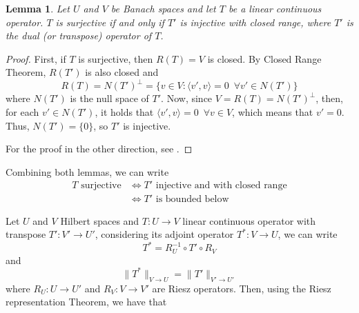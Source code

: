 \documentclass{article}
\newtheorem{lemma}{Lemma}
\begin{document}
\begin{lemma}
    Let \(U\) and \(V\) be Banach spaces and let \(T\) be a linear continuous 
    operator. \(T\) is surjective if and only if \(T'\) is injective with closed 
    range, where \(T'\) is the dual (or transpose) operator of \(T\).
\end{lemma}
\begin{proof}
    First, if \(T\) is surjective, then \(R(T) = V\) is closed. By Closed Range 
    Theorem, \(R(T')\) is also closed and 
    \begin{displaymath}
        R(T) = N(T')^\bot = 
        \{v\in V: \langle v', v\rangle = 0 \,\,\, \forall v' \in N(T')\}
    \end{displaymath}
    where \(N(T')\) is the null space of \(T'\). Now, since 
    \(V = R(T) = N(T')^\bot\), then, for each \(v' \in N(T')\), it holds
    that \( \langle v', v\rangle = 0\,\,\, \forall v \in V\), which means that 
    \(v' = 0\). Thus, \(N(T') = \{0\}\), so \(T'\) is injective.

    For the proof in the other direction, see \cite{chen2024infSup}. 
\end{proof}

Combining both lemmas, we can write
\begin{align*}
    T \text{ surjective}
    &\Longleftrightarrow T'\text{ injective and with closed range}
    \\&\Longleftrightarrow T'\text{ is bounded below}
\end{align*}

Let \(U\) and \(V\) Hilbert spaces and \(T:U\to V\) linear continuous operator
with transpose \(T':V'\to U'\), considering its adjoint operator \(T^*:V \to U\), 
we can write \[T^* = R_U^{-1} \circ T' \circ R_V\] and 
\[\lVert T^* \rVert_{V\to U} = \lVert T' \rVert_{V'\to U'}\] 
where \(R_U: U\to U'\) and 
\(R_V: V\to V'\) are Riesz operators. Then, using the Riesz representation 
Theorem, we have that
\end{document}
